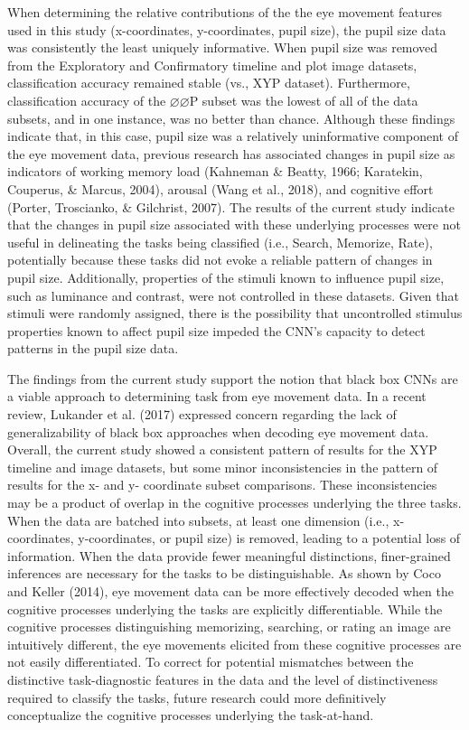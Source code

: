 \documentclass[
  english,
  man, donotrepeattitle,floatsintext]{apa6}
\begin{document}
When determining the relative contributions of the the eye movement features used in this study (x-coordinates, y-coordinates, pupil size), the pupil size data was consistently the least uniquely informative. When pupil size was removed from the Exploratory and Confirmatory timeline and plot image datasets, classification accuracy remained stable (vs., XYP dataset). Furthermore, classification accuracy of the \(\varnothing\varnothing\)P subset was the lowest of all of the data subsets, and in one instance, was no better than chance. Although these findings indicate that, in this case, pupil size was a relatively uninformative component of the eye movement data, previous research has associated changes in pupil size as indicators of working memory load (Kahneman \& Beatty, 1966; Karatekin, Couperus, \& Marcus, 2004), arousal (Wang et al., 2018), and cognitive effort (Porter, Troscianko, \& Gilchrist, 2007). The results of the current study indicate that the changes in pupil size associated with these underlying processes were not useful in delineating the tasks being classified (i.e., Search, Memorize, Rate), potentially because these tasks did not evoke a reliable pattern of changes in pupil size. Additionally, properties of the stimuli known to influence pupil size, such as luminance and contrast, were not controlled in these datasets. Given that stimuli were randomly assigned, there is the possibility that uncontrolled stimulus properties known to affect pupil size impeded the CNN's capacity to detect patterns in the pupil size data.

The findings from the current study support the notion that black box CNNs are a viable approach to determining task from eye movement data. In a recent review, Lukander et al. (2017) expressed concern regarding the lack of generalizability of black box approaches when decoding eye movement data. Overall, the current study showed a consistent pattern of results for the XYP timeline and image datasets, but some minor inconsistencies in the pattern of results for the x- and y- coordinate subset comparisons. These inconsistencies may be a product of overlap in the cognitive processes underlying the three tasks. When the data are batched into subsets, at least one dimension (i.e., x-coordinates, y-coordinates, or pupil size) is removed, leading to a potential loss of information. When the data provide fewer meaningful distinctions, finer-grained inferences are necessary for the tasks to be distinguishable. As shown by Coco and Keller (2014), eye movement data can be more effectively decoded when the cognitive processes underlying the tasks are explicitly differentiable. While the cognitive processes distinguishing memorizing, searching, or rating an image are intuitively different, the eye movements elicited from these cognitive processes are not easily differentiated. To correct for potential mismatches between the distinctive task-diagnostic features in the data and the level of distinctiveness required to classify the tasks, future research could more definitively conceptualize the cognitive processes underlying the task-at-hand.
\end{document}
